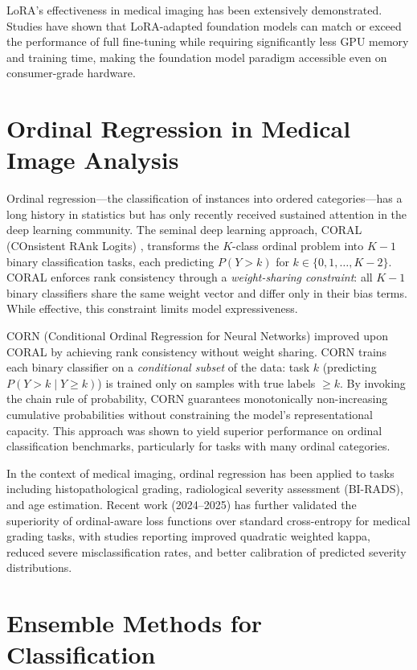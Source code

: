 LoRA's effectiveness in medical imaging has been extensively demonstrated. Studies have shown that LoRA-adapted foundation models can match or exceed the performance of full fine-tuning while requiring significantly less GPU memory and training time, making the foundation model paradigm accessible even on consumer-grade hardware.

\section{Ordinal Regression in Medical Image Analysis}
\label{sec:ordinal_regression_lit}

Ordinal regression---the classification of instances into ordered categories---has a long history in statistics but has only recently received sustained attention in the deep learning community. The seminal deep learning approach, CORAL (COnsistent RAnk Logits) \cite{cao2020rank}, transforms the $K$-class ordinal problem into $K-1$ binary classification tasks, each predicting $P(Y > k)$ for $k \in \{0, 1, \ldots, K-2\}$. CORAL enforces rank consistency through a \emph{weight-sharing constraint}: all $K-1$ binary classifiers share the same weight vector and differ only in their bias terms. While effective, this constraint limits model expressiveness.

CORN (Conditional Ordinal Regression for Neural Networks) \cite{shi2021corn} improved upon CORAL by achieving rank consistency without weight sharing. CORN trains each binary classifier on a \emph{conditional subset} of the data: task $k$ (predicting $P(Y > k \mid Y \geq k)$) is trained only on samples with true labels $\geq k$. By invoking the chain rule of probability, CORN guarantees monotonically non-increasing cumulative probabilities without constraining the model's representational capacity. This approach was shown to yield superior performance on ordinal classification benchmarks, particularly for tasks with many ordinal categories.

In the context of medical imaging, ordinal regression has been applied to tasks including histopathological grading, radiological severity assessment (BI-RADS), and age estimation. Recent work (2024--2025) has further validated the superiority of ordinal-aware loss functions over standard cross-entropy for medical grading tasks, with studies reporting improved quadratic weighted kappa, reduced severe misclassification rates, and better calibration of predicted severity distributions.

\section{Ensemble Methods for Classification}
\label{sec:ensemble_lit}

